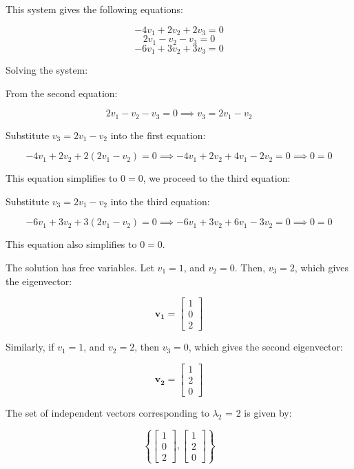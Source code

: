 \documentclass[11pt]{exam}
\begin{document}
\begin{questions}
\begin{parts}
This system gives the following equations:

\[
-4v_1 + 2v_2 + 2v_3 = 0
\]
\[
2v_1 - v_2 - v_3 = 0
\]
\[
-6v_1 + 3v_2 + 3v_3 = 0
\]

Solving the system:

From the second equation:

\[
2v_1 - v_2 - v_3 = 0 \implies v_3 = 2v_1 - v_2
\]

Substitute \( v_3 = 2v_1 - v_2 \) into the first equation:

\[
-4v_1 + 2v_2 + 2(2v_1 - v_2) = 0 \implies -4v_1 + 2v_2 + 4v_1 - 2v_2 = 0 \implies 0 = 0
\]

This equation simplifies to \( 0 = 0 \), we proceed to the third equation:

Substitute \( v_3 = 2v_1 - v_2 \) into the third equation:

\[
-6v_1 + 3v_2 + 3(2v_1 - v_2) = 0 \implies -6v_1 + 3v_2 + 6v_1 - 3v_2 = 0 \implies 0 = 0
\]

This equation also simplifies to \( 0 = 0 \).

The solution has free variables. Let \( v_1 = 1 \), and \( v_2 = 0 \). Then, \( v_3 = 2 \), which gives the eigenvector:

\[
\mathbf{v_1} = \begin{bmatrix} 1 \\ 0 \\ 2 \end{bmatrix}
\]

Similarly, if \( v_1 = 1 \), and \( v_2 = 2 \), then \( v_3 = 0 \), which gives the second eigenvector:

\[
\mathbf{v_2} = \begin{bmatrix} 1 \\ 2 \\ 0 \end{bmatrix}
\]

The set of independent vectors corresponding to $\lambda_2$ = 2 is given by:

\[
\left\{ \begin{bmatrix} 1 \\ 0 \\ 2 \end{bmatrix}, \begin{bmatrix} 1 \\ 2 \\ 0 \end{bmatrix} \right\}
\]


\end{parts}


\end{questions}
\end{document}
